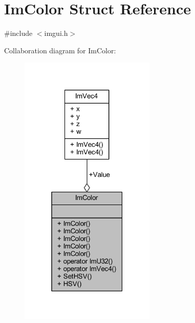 \hypertarget{struct_im_color}{}\section{Im\+Color Struct Reference}
\label{struct_im_color}


{\ttfamily \#include $<$imgui.\+h$>$}



Collaboration diagram for Im\+Color\+:
\nopagebreak
\begin{figure}[H]
\begin{center}
\leavevmode
\includegraphics[width=183pt]{struct_im_color__coll__graph}
\end{center}
\end{figure}
